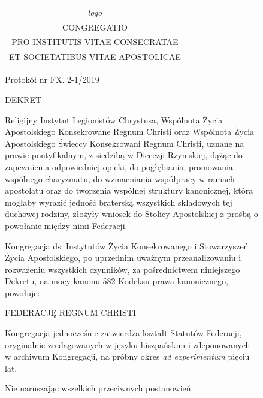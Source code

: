 ﻿\documentclass{book}
\begin{document}
\begin{figure}
\begin{framed}
\begin{footnotesize}






\begin{tabular}{c}
{\em logo} \vspace{.5em} \\
CONGREGATIO\\
PRO INSTITUTIS VITAE CONSECRATAE\\
ET SOCIETATIBUS VITAE APOSTOLICAE 


\end{tabular}




\vspace{1em}
Protokół nr FX. 2-1/2019






\begin{center}DEKRET\end{center}


Religijny Instytut Legionistów Chrystusa, Wspólnota Życia Apostolskiego Konsekrowane Regnum Christi oraz Wspólnota Życia Apostolskiego Świeccy Konsekrowani Regnum Christi, uznane na prawie pontyfikalnym, z siedzibą w Diecezji Rzymskiej, dążąc do zapewnienia odpowiedniej opieki, do pogłębiania, promowania wspólnego charyzmatu, do wzmacniania współpracy w ramach apostolatu oraz do tworzenia wspólnej struktury kanonicznej, która mogłaby wyrazić jedność braterską wszystkich składowych tej duchowej rodziny, złożyły wniosek do Stolicy Apostolskiej z prośbą o powołanie między nimi Federacji.


Kongregacja ds. Instytutów Życia Konsekrowanego i Stowarzyszeń Życia Apostolskiego, po uprzednim uważnym przeanalizowaniu i rozważeniu wszystkich czynników, za pośrednictwem niniejszego Dekretu, na mocy kanonu 582 Kodeksu prawa kanonicznego, powołuje:


\begin{center}FEDERACJĘ REGNUM CHRISTI\end{center}


Kongregacja jednocześnie zatwierdza kształt Statutów Federacji, oryginalnie zredagowanych w języku hiszpańskim i zdeponowanych w archiwum Kongregacji, na próbny okres {\em ad experimentum} pięciu lat. 


\begin{center}
Nie naruszając wszelkich przeciwnych postanowień


\end{center}
\end{footnotesize}
\end{framed}
\end{figure}
\end{document}
